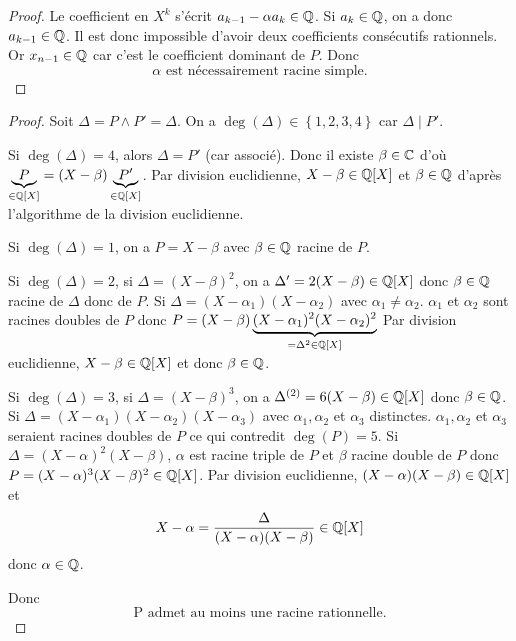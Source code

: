 \documentclass[12pt]{article}
\begin{document}
\begin{proof}
	Le coefficient en $X^{k}$ s'écrit $a_{k-1}-\alpha a_{k}\in\mathbb{Q}$. Si $a_{k}\in\mathbb{Q}$, on a donc $a_{k-1}\in\mathbb{Q}$. Il est donc impossible d'avoir deux coefficients consécutifs rationnels. Or $x_{n-1}\in\mathbb{Q}$ car c'est le coefficient dominant de $P$. Donc 
	\begin{equation}
		\boxed{\alpha\text{ est nécessairement racine simple.}}
	\end{equation}
\end{proof}

\begin{proof}
	Soit $\Delta=P\wedge P'=\Delta$. On a $\deg(\Delta)\in\left\{1,2,3,4\right\}$ car $\Delta\mid P'$.

	Si $\deg(\Delta)=4$, alors $\Delta=P'$ (car associé). Donc il existe $\beta\in\mathbb{C}$ d'où $\underbrace{P}_{\in\mathbb{Q}[X]}=(X-\beta)\underbrace{P'}_{\in\mathbb{Q}[X]}$. Par division euclidienne, $X-\beta\in\mathbb{Q}[X]$ et $\beta\in\mathbb{Q}$ d'après l'algorithme de la division euclidienne.

	Si $\deg(\Delta)=1$, on a $P=X-\beta$ avec $\beta\in\mathbb{Q}$ racine de $P$.

	Si $\deg(\Delta)=2$, si $\Delta=(X-\beta)^{2}$, on a $\Delta'=2(X-\beta)\in\mathbb{Q}[X]$ donc $\beta\in\mathbb{Q}$ racine de $\Delta$ donc de $P$.
	Si $\Delta=(X-\alpha_{1})(X-\alpha_{2})$ avec $\alpha_{1}\neq\alpha_{2}$. $\alpha_{1}$ et $\alpha_{2}$ sont racines doubles de $P$ donc $P=(X-\beta)\underbrace{(X-\alpha_{1})^{2}(X-\alpha_{2})^{2}}_{=\Delta^{2}\in\mathbb{Q}[X]}$
	Par division euclidienne, $X-\beta\in\mathbb{Q}[X]$ et donc $\beta\in\mathbb{Q}$.

	Si $\deg(\Delta)=3$, si $\Delta=(X-\beta)^{3}$, on a $\Delta^{(2)}=6(X-\beta)\in\mathbb{Q}[X]$ donc $\beta\in\mathbb{Q}$.
	Si $\Delta=(X-\alpha_{1})(X-\alpha_{2})(X-\alpha_{3})$ avec $\alpha_{1},\alpha_{2}$ et $\alpha_{3}$ distinctes. $\alpha_{1},\alpha_{2}$ et $\alpha_{3}$ seraient racines doubles de $P$ ce qui contredit $\deg(P)=5$.
	Si $\Delta=(X-\alpha)^{2}(X-\beta)$, $\alpha$ est racine triple de $P$ et $\beta$ racine double de $P$ donc $P=(X-\alpha)^{3}(X-\beta)^{2}\in\mathbb{Q}[X]$. Par division euclidienne, $(X-\alpha)(X-\beta)\in\mathbb{Q}[X]$ et 
	\begin{equation}
		X-\alpha=\frac{\Delta}{(X-\alpha)(X-\beta)}\in\mathbb{Q}[X]
	\end{equation}
	donc $\alpha\in\mathbb{Q}$.

	Donc
	\begin{equation}
		\boxed{\text{P admet au moins une racine rationnelle.}}
	\end{equation}
\end{proof}
\end{document}
